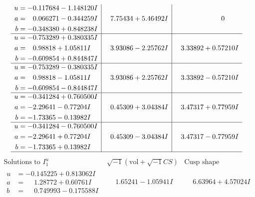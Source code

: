 \documentclass[1p]{elsarticle_modified}
\theoremstyle{definition}
\newcommand{\I}{\sqrt{-1}}
\begin{document}
$$\begin{array}{c|c|c}
\begin{aligned}
u &= -0.117684 - 1.148120 I \\
a &= \phantom{-}0.066271 - 0.344259 I \\
b &= -0.348380 + 0.848238 I\end{aligned}
 & \phantom{-}7.75434 + 5.46492 I & \phantom{-0.000000 } 0 \\ \hline\begin{aligned}
u &= -0.753289 + 0.380335 I \\
a &= \phantom{-}0.98818 + 1.05811 I \\
b &= -0.609854 + 0.844847 I\end{aligned}
 & \phantom{-}3.93086 - 2.25762 I & \phantom{-}3.33892 + 0.57210 I \\ \hline\begin{aligned}
u &= -0.753289 - 0.380335 I \\
a &= \phantom{-}0.98818 - 1.05811 I \\
b &= -0.609854 - 0.844847 I\end{aligned}
 & \phantom{-}3.93086 + 2.25762 I & \phantom{-}3.33892 - 0.57210 I \\ \hline\begin{aligned}
u &= -0.341284 + 0.760500 I \\
a &= -2.29641 - 0.77204 I \\
b &= -1.73365 - 0.13982 I\end{aligned}
 & \phantom{-}0.45309 + 3.04384 I & \phantom{-}3.47317 + 0.77959 I \\ \hline\begin{aligned}
u &= -0.341284 - 0.760500 I \\
a &= -2.29641 + 0.77204 I \\
b &= -1.73365 + 0.13982 I\end{aligned}
 & \phantom{-}0.45309 - 3.04384 I & \phantom{-}3.47317 - 0.77959 I\\
 \hline 
 \end{array}$$\newpage$$\begin{array}{c|c|c}  
\text{Solutions to }I^u_{1}& \I (\text{vol} + \sqrt{-1}CS) & \text{Cusp shape}\\
 \hline 
\begin{aligned}
u &= -0.145225 + 0.813062 I \\
a &= \phantom{-}1.28772 + 0.60761 I \\
b &= \phantom{-}0.749993 - 0.175588 I\end{aligned}
 & \phantom{-}1.65241 - 1.05941 I & \phantom{-}6.63964 + 4.57024 I \\ \hline\begin{aligned}

\end{aligned}
\end{array}$$
\end{document}
